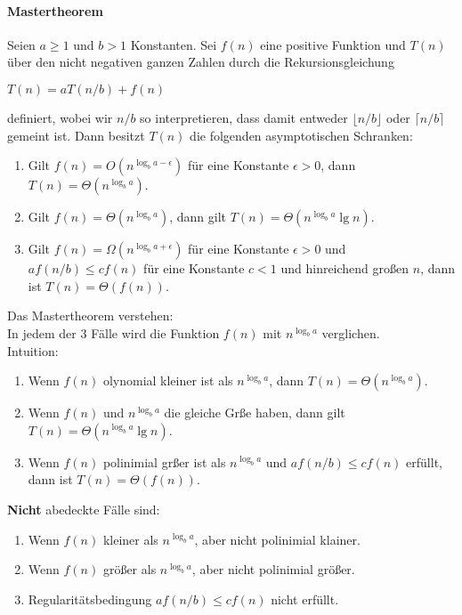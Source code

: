 	\paragraph{Mastertheorem}
	Seien $a \geq 1$ und $b > 1$ Konstanten. Sei $f(n)$ eine positive Funktion und $T(n)$
	über den nicht negativen ganzen Zahlen durch die Rekursionsgleichung
	\begin{center}
		$T(n) = aT(n/b) + f(n)$
	\end{center}
	definiert, wobei wir $n/b$ so interpretieren, dass damit entweder $\lfloor n / b \rfloor$
	oder $\lceil n/b \rceil$ gemeint ist. Dann besitzt $T(n)$ die folgenden asymptotischen Schranken:
	\begin{enumerate}
		\item Gilt $f(n) = O(n^{\log_b a-\epsilon})$ für eine Konstante $\epsilon > 0$, dann $T(n) = \Theta (n^{\log_b a})$.
		\item Gilt $f(n) = \Theta (n^{\log_b a})$, dann gilt $T(n) = \Theta (n^{\log_b a} \lg n)$.
		\item Gilt $f(n) = \Omega (n^{\log_b a+\epsilon})$ für eine Konstante $\epsilon > 0$ und $af(n/b) \leq cf(n)$
			für eine Konstante $c < 1$ und hinreichend gro\ss en $n$, dann ist $T(n) = \Theta (f(n))$.
	\end{enumerate} 
	Das Mastertheorem verstehen: \\
	In jedem der 3 Fälle wird die Funktion $f(n)$ mit $n^{\log_b a}$ verglichen. \\
	Intuition:  
	\begin{enumerate}
		\item Wenn $f(n)$ olynomial kleiner ist als $n^{\log_b a}$, dann $T(n) = \Theta (n^{\log_b a})$.
		\item Wenn $f(n)$ und $n^{\log_b a}$ die gleiche Gr\ss e haben, dann gilt $T(n) = \Theta (n^{\log_b a} \lg n)$.
		\item Wenn $f(n)$ polinimial gr\ss er ist als $n^{\log_b a}$ und $af(n/b) \leq cf(n)$ erfüllt, dann ist $T(n) = \Theta (f(n))$.
	\end{enumerate}
	\textbf{Nicht} abedeckte Fälle sind:
	\begin{enumerate}
		\item Wenn $f(n)$ kleiner als $n^{\log_b a}$, aber nicht polinimial klainer.
		\item Wenn $f(n)$ grö\ss er als $n^{\log_b a}$, aber nicht polinimial grö\ss er.
		\item Regularitätsbedingung $af(n/b) \leq cf(n)$ nicht erfüllt.
	\end{enumerate}




